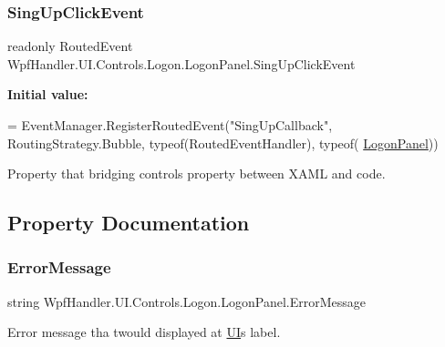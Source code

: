 \subsubsection{\texorpdfstring{Sing\+Up\+Click\+Event}{SingUpClickEvent}}
{\footnotesize\ttfamily readonly Routed\+Event Wpf\+Handler.\+U\+I.\+Controls.\+Logon.\+Logon\+Panel.\+Sing\+Up\+Click\+Event\hspace{0.3cm}{\ttfamily [static]}}

{\bfseries Initial value\+:}
\begin{DoxyCode}
= EventManager.RegisterRoutedEvent(\textcolor{stringliteral}{"SingUpCallback"},
            RoutingStrategy.Bubble, typeof(RoutedEventHandler), typeof(
      \mbox{\hyperlink{class_wpf_handler_1_1_u_i_1_1_controls_1_1_logon_1_1_logon_panel_ad9f500958796fd5161cd258d68b25c21}{LogonPanel}}))
\end{DoxyCode}


Property that bridging control\textquotesingle{}s property between X\+A\+ML and code. 



\subsection{Property Documentation}
\mbox{\label{class_wpf_handler_1_1_u_i_1_1_controls_1_1_logon_1_1_logon_panel_afa45374205dd8e659e084df9699e49b6}} 
\subsubsection{\texorpdfstring{Error\+Message}{ErrorMessage}}
{\footnotesize\ttfamily string Wpf\+Handler.\+U\+I.\+Controls.\+Logon.\+Logon\+Panel.\+Error\+Message\hspace{0.3cm}{\ttfamily [set]}}



Error message tha twould displayed at \mbox{\hyperlink{namespace_wpf_handler_1_1_u_i}{UI}}\textquotesingle{}s label. 

\mbox{\label{class_wpf_handler_1_1_u_i_1_1_controls_1_1_logon_1_1_logon_panel_abf1db78189d11dc269252a5888f7a613}} 
